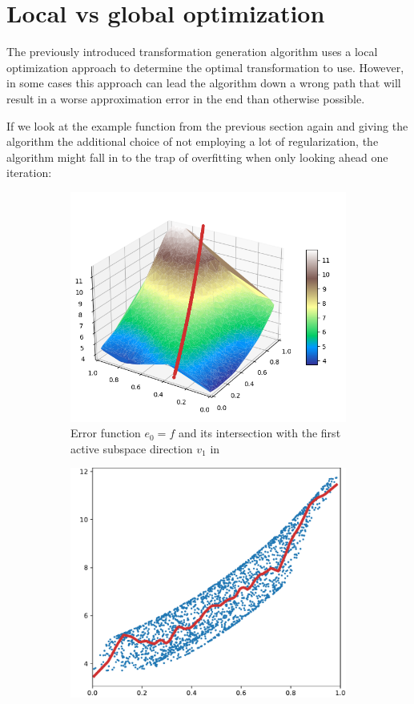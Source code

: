 \documentclass[
  a4paper,  %
  twoside,  %
  bibliography=totoc,
  headsepline,
  cleardoublepage=empty,
  parskip=half,
  draft=false
]{scrbook}
\begin{document}
\section{Local vs global optimization}
\label{sec:lvsg}

The previously introduced transformation generation algorithm uses a local optimization approach to determine the optimal transformation to use.
However, in some cases this approach can lead the algorithm down a wrong path that will result in a worse approximation error in the end than otherwise possible.

If we look at the example function from the previous section again and giving the algorithm the additional choice of not employing a lot of regularization, the algorithm might fall in to the trap of overfitting when only looking ahead one iteration:
\newpage
\begin{mdframed}[style=style]
\begin{figure}[H]
\begin{subfigure}{.5\textwidth}
  \centering
  \includegraphics[width=.85\linewidth]{graphics/pipeline_bad_current_1.png}
  \caption{Error function $e_0=f$ and its intersection with the first active subspace direction $v_1$ in \reddot}
\label{fig:pipeline_bad_current_1}
\end{subfigure}%
\begin{subfigure}{.5\textwidth}
  \centering
  \includegraphics[width=.85\linewidth]{graphics/pipeline_bad_local_1}

\end{subfigure}
\end{figure}
\end{mdframed}
\end{document}
